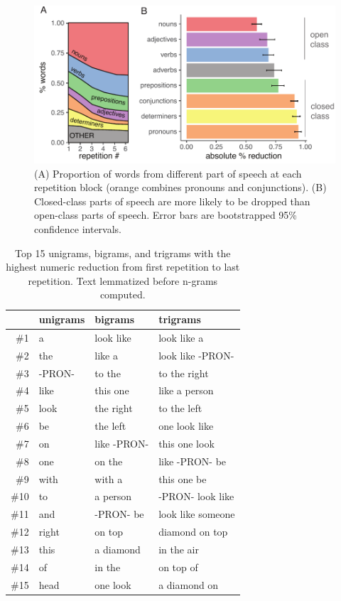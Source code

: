 \documentclass[alpha-refs]{wiley-article}
\begin{document}

\begin{figure}[t!]
\centering
\includegraphics[scale=.8]{posResults.pdf}
\caption{(A) Proportion of words from different part of speech at each repetition block (orange combines pronouns and conjunctions). (B) Closed-class parts of speech are more likely to be dropped than open-class parts of speech. Error bars are bootstrapped 95\% confidence intervals.} 
\label{fig:pos}
\end{figure}

\begin{table}[t]
\centering
\begin{tabular}{|r||l|l|l|}
  \hline
 & unigrams & bigrams & trigrams \\ 
  \hline
\#1 & a & look like & look like a \\ 
  \#2 & the & like a & look like -PRON- \\ 
  \#3 & -PRON- & to the & to the right \\ 
  \#4 & like & this one & like a person \\ 
  \#5 & look & the right & to the left \\ 
  \#6 & be & the left & one look like \\ 
  \#7 & on & like -PRON- & this one look \\ 
  \#8 & one & on the & like -PRON- be \\ 
  \#9 & with & with a & this one be \\ 
  \#10 & to & a person & -PRON- look like \\ 
  \#11 & and & -PRON- be & look like someone \\ 
  \#12 & right & on top & diamond on top \\ 
  \#13 & this & a diamond & in the air \\ 
  \#14 & of & in the & on top of \\ 
  \#15 & head & one look & a diamond on \\ 
   \hline
\end{tabular}
\caption{Top 15 unigrams, bigrams, and trigrams with the highest numeric reduction from first repetition to last repetition. Text lemmatized before n-grams computed. } 
\label{tab:words}
\end{table}
\end{document}
